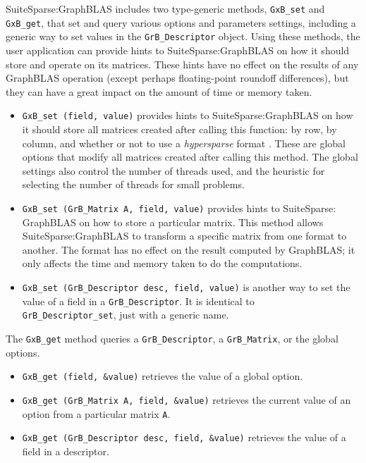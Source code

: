 \documentclass[12pt]{article}
\begin{document}
SuiteSparse:GraphBLAS includes two type-generic methods, \verb'GxB_set' and
\verb'GxB_get', that set and query various options and parameters settings,
including a generic way to set values in the \verb'GrB_Descriptor' object.
Using these methods, the user application can provide hints to
SuiteSparse:GraphBLAS on how it should store and operate on its matrices.
These hints have no effect on the results of any GraphBLAS operation (except
perhaps floating-point roundoff differences), but they can have a great impact
on the amount of time or memory taken.

\begin{itemize}

\item \verb'GxB_set (field, value)' provides hints to
    SuiteSparse:GraphBLAS on how it should store all matrices created after
    calling this function:  by row, by column, and whether or not to use a {\em
    hypersparse} format \cite{BulucGilbert08,BulucGilbert12}.  These are global
    options that modify all matrices created after calling this method.
    The global settings also control the number of threads used, and the
    heuristic for selecting the number of threads for small problems.

\item \verb'GxB_set (GrB_Matrix A, field, value)' provides hints to
    SuiteSparse: GraphBLAS on how to store a particular matrix.  This method
    allows SuiteSparse:GraphBLAS to transform a specific matrix from one format
    to another.  The format has no effect on the result computed by GraphBLAS;
    it only affects the time and memory taken to do the computations.

\item \verb'GxB_set (GrB_Descriptor desc, field, value)' is another way to
    set the value of a field in a \verb'GrB_Descriptor'.  It is identical to \\
    \verb'GrB_Descriptor_set', just with a generic name.

\end{itemize}

The \verb'GxB_get' method queries a \verb'GrB_Descriptor', a \verb'GrB_Matrix',
or the global options.

\begin{itemize}

\item \verb'GxB_get (field, &value)' retrieves the value of
    a global option.

\item \verb'GxB_get (GrB_Matrix A, field, &value)' retrieves the current
    value of an option from a particular matrix \verb'A'.

\item \verb'GxB_get (GrB_Descriptor desc, field, &value)' retrieves the value
    of a field in a descriptor.

\end{itemize}
\end{document}
